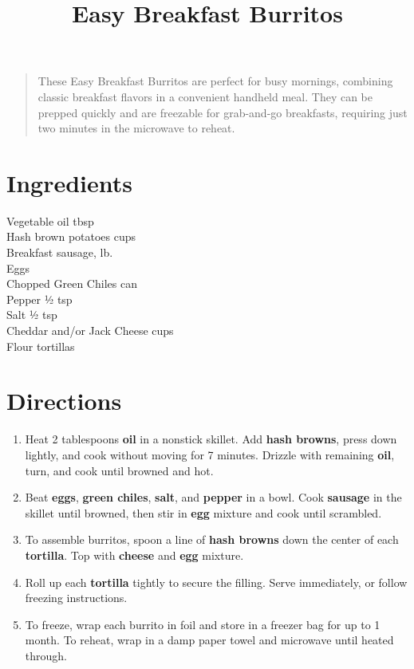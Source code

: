 \documentclass[11pt,letterpaper]{article}
\title{Easy Breakfast Burritos}
\author{}
\date{}
\begin{document}
\maketitle
\thispagestyle{empty}

\begin{quote}
\small
\begin{em}
These Easy Breakfast Burritos are perfect for busy mornings, combining classic breakfast flavors in a convenient handheld meal. They can be prepped quickly and are freezable for grab-and-go breakfasts, requiring just two minutes in the microwave to reheat.
\end{em}
\end{quote}

\section*{Ingredients}
\setlength{\columnsep}{20pt}
\begin{multicols}{2}
\noindent
    Vegetable oil  tbsp \\
    Hash brown potatoes  cups \\
    Breakfast sausage,  lb. \\
    Eggs  \\
    \columnbreak
    Chopped Green Chiles  can \\
    Pepper \dotfill ½ tsp \\
    Salt \dotfill ½ tsp \\
	Cheddar and/or  Jack Cheese  cups \\
    Flour tortillas  \\
\end{multicols}

\section*{Directions}

\begin{enumerate}
    \item Heat 2 tablespoons \textbf{oil} in a nonstick skillet. Add \textbf{hash browns}, press down lightly, and cook without moving for 7 minutes. Drizzle with remaining \textbf{oil}, turn, and cook until browned and hot.
    \item Beat \textbf{eggs}, \textbf{green chiles}, \textbf{salt}, and \textbf{pepper} in a bowl. Cook \textbf{sausage} in the skillet until browned, then stir in \textbf{egg} mixture and cook until scrambled.
    \item To assemble burritos, spoon a line of \textbf{hash browns} down the center of each \textbf{tortilla}. Top with \textbf{cheese} and \textbf{egg} mixture.
    \item Roll up each \textbf{tortilla} tightly to secure the filling. Serve immediately, or follow freezing instructions.
    \item To freeze, wrap each burrito in foil and store in a freezer bag for up to 1 month. To reheat, wrap in a damp paper towel and microwave until heated through.
\end{enumerate}
\end{document}
